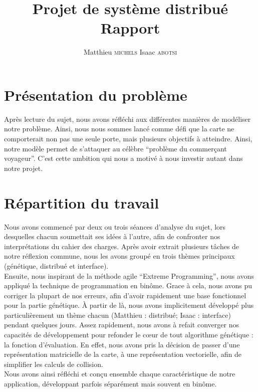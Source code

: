 \documentclass[a4paper]{article}
\begin{document}
\author{Matthieu \textsc{michels}   Isaac \textsc{abotsi}}
\title{Projet de système distribué \\ Rapport}
% 
% 
\maketitle

\section*{Présentation du problème}
Après lecture du sujet, nous avons réfléchi aux différentes manières de modéliser notre problème. Ainsi, nous nous sommes lancé comme défi que la carte ne comporterait non pas une seule porte, mais plusieurs objectifs à atteindre. Ainsi, notre modèle permet de s’attaquer au célèbre “problème du commerçant voyageur”. C’est cette ambition qui nous a motivé à nous investir autant dans notre projet. \\


\section*{Répartition du travail}
Nous avons commencé par deux ou trois séances d’analyse du sujet, lors desquelles chacun soumettait ses idées à l’autre, afin de confronter nos interprétations du cahier des charges. Après avoir extrait plusieurs tâches de notre réflexion commune, nous les avons groupé en trois thèmes principaux (génétique, distribué et interface). \\
Ensuite, nous inspirant de la méthode agile “Extreme Programming”, nous avons appliqué la technique de programmation en binôme. Grace à cela, nous avons pu corriger la plupart de nos erreurs, afin d’avoir rapidement une base fonctionnel pour la partie génétique. À partir de là, nous avons implicitement développé plus particulièrement un thème chacun (Matthieu : distribué; Isaac : interface) pendant quelques jours. Assez rapidement, nous avons à refait converger nos capacités de développement pour refonder le cœur de tout algorithme génétique : la fonction d’évaluation. En effet, nous avons pris la décision de passer d’une représentation matricielle de la carte, à une représentation vectorielle, afin de simplifier les calculs de collision. \\
Nous avons ainsi réfléchi et conçu ensemble chaque caractéristique de notre application, développant parfois séparément mais souvent en binôme. \\
\end{document}
